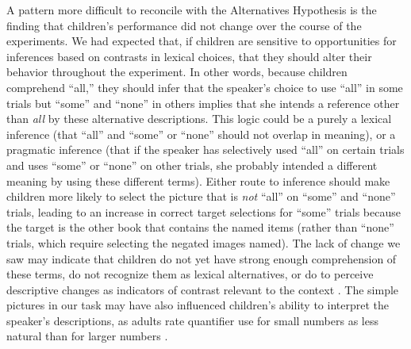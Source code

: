 \documentclass[10pt,letterpaper]{article}
\begin{document}


A pattern more difficult to reconcile with the Alternatives Hypothesis is the finding that children's performance did not change over the course of the experiments. We had expected that, if children are sensitive to opportunities for inferences based on contrasts in lexical choices, that they should alter their behavior throughout the experiment. In other words, because children comprehend ``all,'' they should infer that the speaker's choice to use ``all'' in some trials but ``some'' and ``none'' in others implies that she intends a reference other than \emph{all} by these alternative descriptions. This logic could be a purely a lexical inference (that ``all'' and ``some'' or ``none'' should not overlap in meaning), or a pragmatic inference (that if the speaker has selectively used ``all'' on certain trials and uses ``some'' or ``none'' on other trials, she probably intended a different meaning by using these different terms). Either route to inference should make children more likely to select the picture that is \emph{not} ``all'' on ``some'' and ``none'' trials, leading to an increase in correct target selections for ``some'' trials because the target is the other book that contains the named items (rather than ``none'' trials, which require selecting the negated images named). The lack of change we saw may indicate that children do not yet have strong enough comprehension of these terms, do not recognize them as lexical alternatives, or do to perceive descriptive changes as indicators of contrast relevant to the context \citep{skordos2014}. The simple pictures in our task may have also influenced children's ability to interpret the speaker's descriptions, as adults rate quantifier use for small numbers as less natural than for larger numbers \citep{degen2014b}. 
\end{document}
